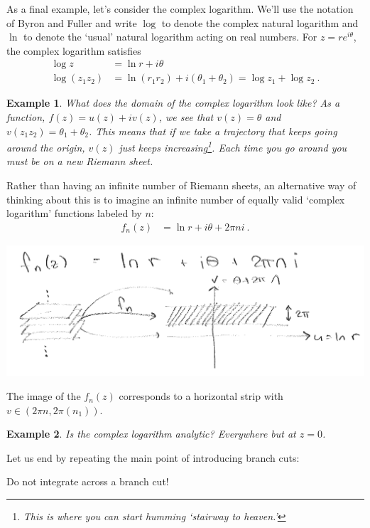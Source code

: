 \documentclass[
  11pt,
	colorful,
	raggedright,
]{tufte-style-thesis-flip}
\newtheorem{example}{Example}[section]
\begin{document}
As a final example, let's consider the complex logarithm. We'll use the notation of Byron and Fuller and write $\log$ to denote the complex natural logarithm and $\ln$ to denote the `usual' natural logarithm acting on real numbers. For $z=r e^{i\theta}$, the complex logarithm satisfies
\begin{align}
  \log z &= \ln r + i \theta
  \\
  \log(z_1z_2)
  &=\ln(r_1r_2) + i (\theta_1+\theta_2)
  = \log z_1 + \log z_2 \ .
\end{align}
\begin{example}
What does the domain of the complex logarithm look like? As a function, $f(z) = u(z) + i v(z)$, we see that $v(z) = \theta$ and $v(z_1z_2)=\theta_1+\theta_2$. This means that if we take a trajectory that keeps going around the origin, $v(z)$ just keeps increasing\footnote{This is where you can start humming `stairway to heaven.'}. Each time you go around you must be on a new Riemann sheet. 
\end{example}
Rather than having an infinite number of Riemann sheets, an alternative way of thinking about this is to imagine an infinite number of equally valid `complex logarithm' functions labeled by $n$:
\begin{align}
  f_n(z) &= \ln r + i \theta + 2\pi n i \ .
\end{align}
\begin{center}
\includegraphics[width=\textwidth]{figures/lec13_map5.png}
\end{center}
The image of the $f_n(z)$ corresponds to a horizontal strip with $v\in \left(2\pi n, 2\pi(n_1)\right)$.
\begin{example}
Is the complex logarithm analytic? Everywhere but at $z=0$.
\end{example}
Let us end by repeating the main point of introducing branch cuts:
\begin{framed}
\begin{center}
Do not integrate across a branch cut!
\end{center}
\end{framed}
\end{document}
